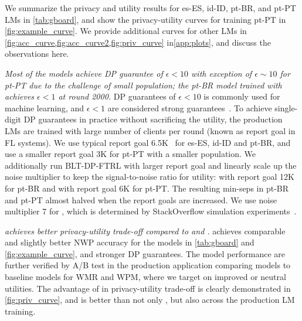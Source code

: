  We summarize the privacy and utility results for es-ES, id-ID, pt-BR, and pt-PT LMs in \cref{tab:gboard}, and show the privacy-utility curves for training pt-PT in \cref{fig:example_curve}. We provide additional curves for other LMs in \cref{fig:acc_curve,fig:acc_curve2,fig:priv_curve} in\cref{app:plots}, and discuss the observations here.
\begin{enumerate*}[label=\color{purple}(\arabic*)]
    \item \emph{Most of the models achieve DP guarantee of $\epsilon<10$ with exception of $\epsilon \sim 10$ for pt-PT due to the challenge of small population; the pt-BR model trained with  achieves $\epsilon<1$ at round 2000.} DP guarantees of $\epsilon<10$ is commonly used for machine learning, and $\epsilon<1$ are considered strong guarantees~\citep{ponomareva2023dpfy}. To achieve single-digit DP guarantees in practice without sacrificing the utility, the production LMs are trained with large number of clients per round (known as report goal in FL systems). We use typical report goal 6.5K~\citep{xu2023federated} for es-ES, id-ID and pt-BR, and use a smaller report goal 3K for pt-PT with a smaller population. We additionally run BLT-DP-FTRL with larger report goal and linearly scale up the noise multiplier to keep the signal-to-noise ratio for utility:  with report goal 12K for pt-BR and  with report goal 6K for pt-PT. The resulting min-seps in pt-BR and pt-PT almost halved when the report goals are increased. We use noise multiplier 7 for \treeagg, which is determined by StackOverflow simulation experiments~\citep{xu2023federated}. 
    \item \emph{\blt achieves better privacy-utility trade-off compared to \treeagg and \bandmf.} \blt achieves comparable and slightly better NWP accuracy for the models in \cref{tab:gboard} and  \cref{fig:example_curve}, and stronger DP guarantees. The model performance are further verified by A/B test in the production application comparing \blt models to baseline models for WMR and WPM, where we target on improved or neutral utilities. The advantage of \blt in privacy-utility trade-off is clearly demonstrated in \cref{fig:priv_curve}, and \blt is better than not only \treeagg, but also \bandmf across the production LM training. 

\end{enumerate*}
